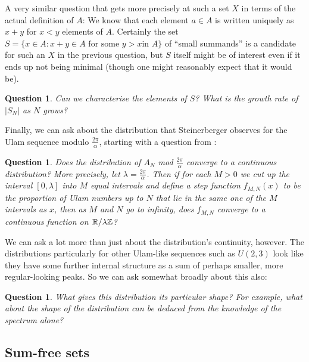 \documentclass{article}
\newtheorem{question}[theorem]{Question}
\theoremstyle{definition}
\theoremstyle{remark}
\numberwithin{equation}{section}
\begin{document}
A very similar question that gets more precisely at such a set $X$ in
terms of the actual definition of $A$: We know that each element
$a \in A$ is written uniquely as $x+y$ for $x < y$ elements of $A$.
Certainly the set $S = \{x \in A : x + y \in A\text{ for some $y > x$
  in $A$}\}$ of ``small summands'' is a candidate for such an $X$ in
the previous question, but $S$ itself might be of interest even if it
ends up not being minimal (though one might reasonably expect that it
would be).

\begin{question}\label{qn:fulcrum}
  Can we characterise the elements of $S$?  What is the growth rate of
  $|S_N|$ as $N$ grows?
\end{question}

Finally, we can ask about the distribution that Steinerberger observes
for the Ulam sequence modulo $\frac{2\pi}{\alpha}$, starting with a
question from \cite{ulam_steinerberger}: 

\begin{question}\label{qn:continuity}
  Does the distribution of $A_N$ mod $\frac{2\pi}{\alpha}$ converge to
  a continuous distribution?  More precisely, let
  $\lambda = \frac{2\pi}{\alpha}$.  Then if for each $M > 0$ we cut up
  the interval $[0,\lambda]$ into $M$ equal intervals and define a
  step function $f_{M,N}(x)$ to be the proportion of Ulam numbers up
  to $N$ that lie in the same one of the $M$ intervals as $x$, then as
  $M$ and $N$ go to infinity, does $f_{M,N}$ converge to a continuous
  function on $\mathbb{R}/\lambda\mathbb{Z}$?
\end{question}

We can ask a lot more than just about the distribution's continuity,
however.  The distributions particularly for other Ulam-like sequences
such as $U(2,3)$ look like they have some further internal structure
as a sum of perhaps smaller, more regular-looking peaks.  So we can
ask somewhat broadly about this also: 

\begin{question}\label{qn:shape}
  What gives this distribution its particular shape?  For example,
  what about the shape of the distribution can be deduced from the
  knowledge of the spectrum alone?
\end{question}

\subsection{Sum-free sets}
\end{document}
